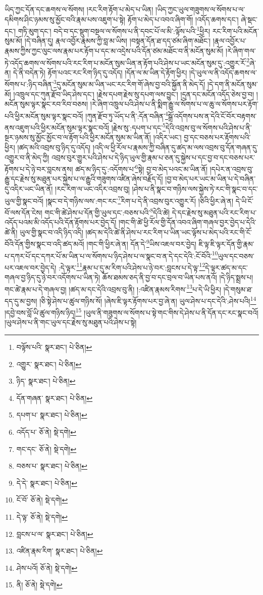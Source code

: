 ཡིད་ཀྱང་དོན་དང་ཆགས་ལ་སོགས། །རང་རིག་རྟོག་པ་མེད་པ་ཡིན། །ཡིད་ཀྱང་ཡུལ་གཟུགས་ལ་སོགས་པ་ལ་དམིགས་ཤིང་ཉམས་སུ་མྱོང་བའི་རྣམ་པས་འཇུག་པ་སྟེ། རྟོག་པ་མེད་པ་འབའ་ཞིག་གོ། །འདོད་ཆགས་དང་། ཞེ་སྡང་དང་། གཏི་མུག་དང་། བདེ་བ་དང་སྡུག་བསྔལ་ལ་སོགས་པ་ནི་དབང་པོ་ལ་མི་:ལྟོས་པའི་\footnote{བལྟོས་པའི་  སྣར་ཐང་།  པེ་ཅིན། }ཕྱིར། རང་རིག་པའི་མངོན་སུམ་མོ། །དེ་བཞིན་དུ། རྣལ་འབྱོར་རྣམས་ཀྱི་བླ་མ་ཡིས། །བསྟན་དོན་ཐ་དད་ཙམ་ཞིག་མཐོང་། །རྣལ་འབྱོར་པ་རྣམས་ཀྱིས་ཀྱང་ལུང་ལས་རྣམ་པར་རྟོག་པ་དང་མ་འདྲེས་པའི་དོན་ཙམ་མཐོང་བ་ནི་མངོན་སུམ་མོ། །རེ་ཞིག་གལ་ཏེ་འདོད་ཆགས་ལ་སོགས་པའི་རང་རིག་པ་མངོན་སུམ་ཡིན་ན་རྟོག་པའི་ཤེས་པ་ཡང་མངོན་སུམ་དུ་:འགྱུར་རོ་\footnote{འགྱུར་  སྣར་ཐང་།  པེ་ཅིན། }ཞེ་ན། དེ་ནི་བདེན་ཏེ། རྟོག་པའང་རང་རིག་ཉིད་དུ་འདོད། །དོན་ལ་མ་ཡིན་དེ་རྟོག་ཕྱིར། །དེ་ཡུལ་ལ་ནི་འདོད་ཆགས་ལ་སོགས་པ་:ཉིད་བཞིན་\footnote{ཉིད་  སྣར་ཐང་།  པེ་ཅིན། }དུ་མངོན་སུམ་མ་ཡིན་ཡང་རང་རིག་གོ་ཞེས་བྱ་བའི་སྐྱོན་ནི་མེད་དོ། །དེ་དག་ནི་མངོན་སུམ་མོ། །འཁྲུལ་དང་ཀུན་རྫོབ་ཡིད་ཤེས་དང་། །རྗེས་དཔག་རྗེས་སུ་དཔག་ལས་བྱུང་། །དྲན་དང་མངོན་འདོད་ཅེས་བྱ་བ། །མངོན་སུམ་ལྟར་སྣང་རབ་རིབ་བཅས། །རེ་ཞིག་འཁྲུལ་པའི་ཤེས་པ་ནི་སྨིག་རྒྱུ་ལ་སོགས་པ་ལ་ཆུ་ལ་སོགས་པར་རྟོག་པའི་ཕྱིར་མངོན་སུམ་ལྟར་སྣང་བའོ། །ཀུན་རྫོབ་ཏུ་ཡོད་པ་ནི་:དོན་བཞིན་\footnote{དོན་གཞན་  སྣར་ཐང་།  པེ་ཅིན། }སྒྲོ་འདོགས་པས་ན་དེའི་ངོ་བོར་བརྟགས་ནས་འཇུག་པའི་ཕྱིར་མངོན་སུམ་ལྟར་སྣང་བའོ། །རྗེས་སུ་:དཔག་པ་དང་\footnote{དཔག་པ་  སྣར་ཐང་།  པེ་ཅིན། }དེའི་འབྲས་བུ་ལ་སོགས་པའི་ཤེས་པ་ནི་སྔར་ཉམས་སུ་མྱོང་མྱོང་བ་ལ་རྟོག་པའི་ཕྱིར་མངོན་སུམ་མ་ཡིན་ནོ། །འདིར་ཡང་། བྱ་དང་བཅས་པར་རྟོགས་པའི་ཕྱིར། །ཚད་མའི་འབྲས་བུ་ཉིད་དུ་འདོད། །འདི་ལ་ཕྱི་རོལ་པ་རྣམས་ཀྱི་བཞིན་དུ་ཚད་མ་ལས་འབྲས་བུ་དོན་གཞན་དུ་འགྱུར་བ་ནི་མེད་ཀྱི། འབྲས་བུར་གྱུར་པའི་ཤེས་པ་དེ་ཉིད་ཡུལ་གྱི་རྣམ་པ་ཅན་དུ་སྐྱེས་པ་དང་བྱ་བ་དང་བཅས་པར་རྟོགས་པ་དེ་ཉེ་བར་བླངས་ནས། ཚད་མ་ཉིད་དུ་:འདོགས་པ་\footnote{འདོད་པ་  ཅོ་ནེ།  སྡེ་དགེ། }སྟེ། བྱ་བ་མེད་པའང་མ་ཡིན་ནོ། །དཔེར་ན་འབྲས་བུ་རྒྱུ་དང་རྗེས་སུ་མཐུན་པར་སྐྱེས་པ་ལ་རྒྱུའི་གཟུགས་འཛིན་ཞེས་བརྗོད་དོ། །བྱ་བ་མེད་པར་ཡང་མ་ཡིན་པ་དེ་བཞིན་དུ་འདིར་ཡང་ཡིན་ནོ། །རང་རིག་ལ་ཡང་འདིར་འབྲས་བུ། །ཤེས་པ་ནི་སྣང་བ་གཉིས་ལས་སྐྱེས་ཏེ་རང་གི་སྣང་བ་དང་ཡུལ་གྱི་སྣང་བའོ། །སྣང་བ་དེ་གཉིས་ལས་:གང་རང་\footnote{གང་དང་  ཅོ་ནེ།  སྡེ་དགེ། }རིག་པ་དེ་ནི་འབྲས་བུར་འགྱུར་རོ། །ཅིའི་ཕྱིར་ཞེ་ན། དེ་ཡི་ངོ་བོ་ལས་དོན་ངེས། གང་གི་ཚེ་ཤེས་པ་དོན་གྱི་ཡུལ་དང་:བཅས་པའི་\footnote{བཅས་པ་  སྣར་ཐང་།  པེ་ཅིན། }དེའི་ཚེ། དེ་དང་རྗེས་སུ་མཐུན་པའི་རང་རིག་པ་འདོད་པའམ་མི་འདོད་པའི་དོན་རྟོགས་པར་བྱེད་དོ། །གང་གི་ཚེ་ཕྱི་རོལ་གྱི་དོན་འབའ་ཞིག་གཞལ་བྱར་བྱེད་པ་དེའི་ཚེ་ནི། ཡུལ་གྱི་སྣང་བ་འདི་ཉིད་འདི། །ཚད་མ་དེའི་ཚེ་ནི་ཤེས་པ་རང་རིག་པ་ཡིན་ཡང་ལྟོས་པ་མེད་པའི་རང་གི་ངོ་བོའི་དོན་གྱིས་སྣང་བ་འདི་ཚད་མའོ། །གང་གི་ཕྱིར་ཞེ་ན། དོན་དེ་\footnote{དེ་དེ་  སྣར་ཐང་།  པེ་ཅིན། }ཡིས་འཇལ་བར་བྱེད། ཇི་ལྟ་ཇི་ལྟར་དོན་གྱི་རྣམ་པ་དཀར་པོ་དང་དཀར་པོ་མ་ཡིན་པ་ལ་སོགས་པ་ཉིད་ཤེས་པ་ལ་སྣང་བ་ན་དེ་དང་དེའི་:ངོ་བོའི་\footnote{ངོ་བོ་  ཅོ་ནེ།  སྡེ་དགེ། }ཡུལ་དང་བཅས་པར་འཇལ་བར་བྱེད་དེ། :དེ་ལྟར་\footnote{དེ་ལྟ་  ཅོ་ནེ།  སྡེ་དགེ། }རྣམ་པ་དུ་མ་རིག་པའི་ཤེས་པ་ཉེ་བར་:བླངས་པ་དེ་ལྟ་\footnote{བླངས་པ་ལ་  སྣར་ཐང་།  པེ་ཅིན། }དེ་ལྟར་ཚད་མ་དང་གཞལ་བྱ་ཉིད་དུ་ཉེ་བར་འདོགས་པ་ཡིན་ཏེ། ཆོས་ཐམས་ཅད་ནི་བྱ་བ་དང་བྲལ་བ་ཡིན་པས་ནའོ། །དེ་ཉིད་སྨྲས་པ། གང་ཚེ་རྣམ་པ་དེ་གཞལ་བྱ། །ཚད་མ་དང་དེའི་འབྲས་བུ་ནི། །:འཛིན་རྣམས་རིགས་\footnote{འཛིན་རྣམ་རིག་  སྣར་ཐང་།  པེ་ཅིན། }པ་དེ་ཡི་ཕྱིར། །དེ་གསུམ་ཐ་དད་དུ་མ་བྱས། །ཅི་སྟེ་ཤེས་པ་ཚུལ་གཉིས་སོ། །ཞེས་ཇི་ལྟར་རྟོགས་པར་བྱ་ཞེ་ན། ཡུལ་ཤེས་པ་དང་དེའི་:ཤེས་པའི།\footnote{ཤེས་པའོ།  ཅོ་ནེ།  སྡེ་དགེ། } །དབྱེ་བས་བློ་ཡི་ཚུལ་གཉིས་ཉིད།\footnote{ནི།  ཅོ་ནེ།  སྡེ་དགེ། } །ཡུལ་ནི་གཟུགས་ལ་སོགས་པ་སྟེ་གང་གིས་དེ་ཤེས་པ་ནི་དོན་དང་རང་སྣང་བའོ། །ཡུལ་ཤེས་པ་ནི་གང་ཡུལ་དང་རྗེས་སུ་མཐུན་པའི་ཤེས་པ་སྟེ། 